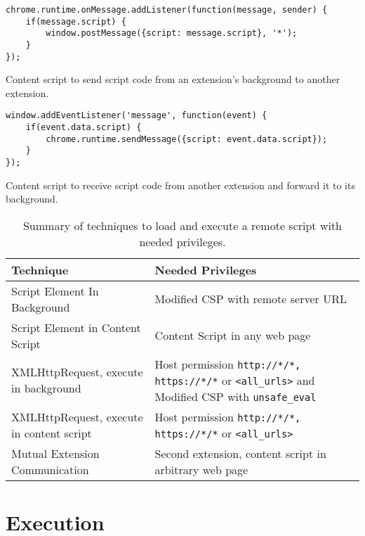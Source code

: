 	\begin{code}
		\begin{lstlisting}
chrome.runtime.onMessage.addListener(function(message, sender) {
	if(message.script) {
		window.postMessage({script: message.script}, '*');
	}
});
\end{lstlisting}
		\caption{Content script to send script code from an extension's background to another extension.}
		\label{code:sendScriptToOtherExtension}
	\end{code}
	
	\begin{code}
		\begin{lstlisting}
window.addEventListener('message', function(event) {
	if(event.data.script) {
		chrome.runtime.sendMessage({script: event.data.script});
	}
});
\end{lstlisting}
		\caption{Content script to receive script code from another extension and forward it to its background.}
		\label{code:receiveScriptFromOtherExtension}
	\end{code}

	\begin{table}[h]
		\centering
		\begin{tabular}{|l|p{}|} \hline
			\textbf{Technique} & \textbf{Needed Privileges} \\ \hline
			Script Element In Background & Modified CSP with remote server URL \\
			Script Element in Content Script & Content Script in any web page \\
			XMLHttpRequest, execute in background & Host permission \texttt{http://*/*, https://*/*} or \texttt{<all\_urls>} and Modified CSP with \texttt{unsafe\_eval} \\
			XMLHttpRequest, execute in content script & Host permission \texttt{http://*/*, https://*/*} or \texttt{<all\_urls>} \\
			Mutual Extension Communication & Second extension, content script in arbitrary web page 
			\\ \hline
		\end{tabular}
		\caption{Summary of techniques to load and execute a remote script with needed privileges.}
		\label{tab:summaryFetchScript}
	\end{table}
	



\newpage
\section{Execution}

